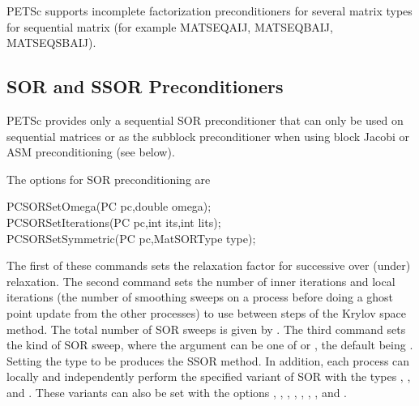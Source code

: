 \label{sec_pcfactor}
PETSc supports incomplete factorization preconditioners for several matrix
types for sequential matrix (for example MATSEQAIJ, MATSEQBAIJ, MATSEQSBAIJ).



\subsection{SOR and SSOR Preconditioners}

PETSc provides only a sequential SOR preconditioner that can only be used on sequential
matrices or as the subblock preconditioner when using block Jacobi or
ASM preconditioning (see below).

The options for SOR   
preconditioning are
\begin{tabbing}
  PCSORSetOmega(PC pc,double omega);\\
  PCSORSetIterations(PC pc,int its,int lits);\\
  PCSORSetSymmetric(PC pc,MatSORType type);
\end{tabbing}
The
first of these commands sets the relaxation factor for successive
over (under) relaxation.  The second command sets the number of inner
iterations  and local iterations 
(the number of smoothing sweeps on a
process before doing a ghost point update from the other processes)
to use between steps of the
Krylov space method. The total number of SOR sweeps is given by .
The third command sets the kind of SOR sweep,
where the argument  can be one of  or , the default
being . Setting the type to be  produces the SSOR method.  In addition,
each process can locally and independently perform the specified
variant of SOR with the types ,
, and .
These  
variants  
can  
also be set with the options ,
,  ,
,  ,
,  , and
.
 
 
 

